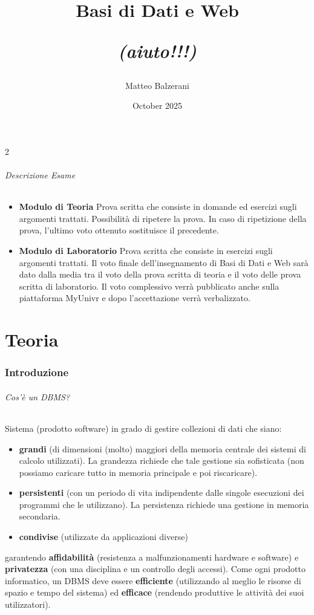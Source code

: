 \documentclass{article}
\title{\Huge \textbf{Basi di Dati e Web}
	\small
	
	
	\textit{(aiuto!!!)}}
\author{Matteo Balzerani}
\date{October 2025}
\begin{document}
	
	\maketitle
	\small
	\begin{multicols}{2}
		\tableofcontents  %
	\end{multicols}
	\newpage
	\normalsize
	\paragraph{Descrizione Esame}
	\begin{itemize}
		\item \textbf{Modulo di Teoria}
		Prova scritta che consiste in domande ed esercizi sugli argomenti trattati. Possibilità di ripetere la prova. In caso di ripetizione della prova, l'ultimo voto ottenuto sostituisce il precedente. 
		
		\item \textbf{Modulo di Laboratorio}
		Prova scritta che consiste in esercizi sugli argomenti trattati. Il voto finale dell'insegnamento di Basi di Dati e Web sarà dato dalla media tra il voto
		della prova scritta di teoria e il voto delle prova scritta di laboratorio. Il voto complessivo verrà pubblicato anche sulla piattaforma MyUnivr e dopo l’accettazione verrà verbalizzato.
	\end{itemize}
	\part{Teoria}
	\section{Introduzione}
	\paragraph{Cos'è un DBMS?} Sistema (prodotto software) in grado di gestire collezioni di dati che siano:
	\begin{itemize}
		\item \textbf{grandi} (di dimensioni (molto) maggiori della memoria centrale dei sistemi di
		calcolo utilizzati). La grandezza richiede che tale gestione sia sofisticata (non
		possiamo caricare tutto in memoria principale e poi
		riscaricare).
		\item \textbf{persistenti} (con un periodo di vita indipendente dalle singole esecuzioni dei
		programmi che le utilizzano). La persistenza richiede una gestione in memoria
		secondaria.
		\item \textbf{condivise} (utilizzate da applicazioni diverse)
			\end{itemize}
		garantendo \textbf{affidabilità} (resistenza a malfunzionamenti
		hardware e software) e \textbf{privatezza} (con una disciplina e un
		controllo degli accessi).
		Come ogni prodotto informatico, un DBMS deve essere
		\textbf{efficiente} (utilizzando al meglio le risorse di spazio e tempo
		del sistema) ed \textbf{efficace} (rendendo produttive le attività dei
		suoi utilizzatori).
\end{document}
